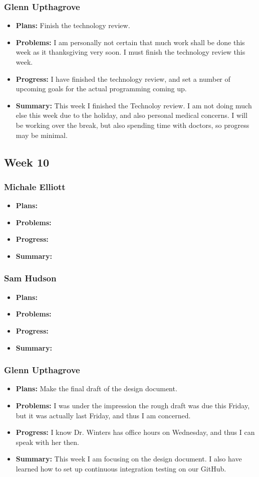 \documentclass[onecolumn, draftclsnofoot,10pt, compsoc]{IEEEtran}
\begin{document}
\subsubsection{Glenn Upthagrove}
\begin {itemize}
 \item \textbf{Plans: }Finish the technology review. 
 \item \textbf{Problems: }I am personally not certain that much work shall be done this week as it thanksgiving very soon. I must finish the technology review this week.
 \item \textbf{Progress: }I have finished the technology review, and set a number of upcoming goals for the actual programming coming up. 
 \item \textbf{Summary: }This week I finished the Technoloy review. I am not doing much else this week due to the holiday, and also personal medical concerns. I will be working over the break, but also spending time with doctors, so progress may be minimal. 
\end {itemize}
\subsection {Week 10}
\subsubsection{Michale Elliott}
\begin {itemize}
 \item \textbf{Plans: }
 \item \textbf{Problems: }
 \item \textbf{Progress: }
 \item \textbf{Summary: }
\end {itemize}
\subsubsection{Sam Hudson}
\begin {itemize}
 \item \textbf{Plans: }
 \item \textbf{Problems: }
 \item \textbf{Progress: }
 \item \textbf{Summary: }
\end {itemize}
\subsubsection{Glenn Upthagrove}
\begin {itemize}
 \item \textbf{Plans: }Make the final draft of the design document. 
 \item \textbf{Problems: }I was under the impression the rough draft was due this Friday, but it was actually last Friday, and thus I am concerned. 
 \item \textbf{Progress: }I know Dr. Winters has office hours on Wednesday, and thus I can speak with her then.
 \item \textbf{Summary: }This week I am focusing on the design document. I also have learned how to set up continuous integration testing on our GitHub.
\end {itemize}


%
%
\end{document}

